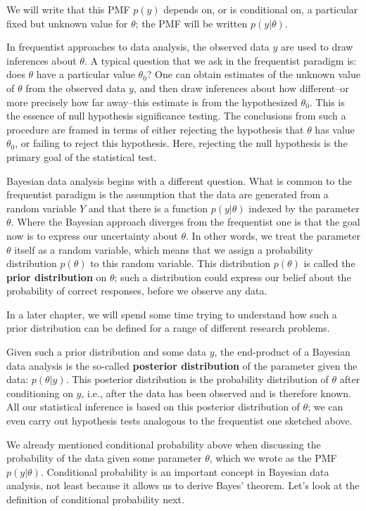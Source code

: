 \documentclass[12pt,]{krantz}
\theoremstyle{definition}
\theoremstyle{definition}
\theoremstyle{definition}
\theoremstyle{remark}
\begin{document}
We will write that this PMF \(p(y)\) depends on, or is conditional on, a particular fixed but unknown value for \(\theta\); the PMF will be written \(p(y|\theta)\).

In frequentist approaches to data analysis, the observed data \(y\) are used to draw inferences about \(\theta\). A typical question that we ask in the frequentist paradigm is: does \(\theta\) have a particular value \(\theta_0\)? One can obtain estimates of the unknown value of \(\theta\) from the observed data \(y\), and then draw inferences about how different--or more precisely how far away--this estimate is from the hypothesized \(\theta_0\). This is the essence of null hypothesis significance testing. The conclusions from such a procedure are framed in terms of either rejecting the hypothesis that \(\theta\) has value \(\theta_0\), or failing to reject this hypothesis. Here, rejecting the null hypothesis is the primary goal of the statistical test.

Bayesian data analysis begins with a different question. What is common to the frequentist paradigm is the assumption that the data are generated from a random variable \(Y\) and that there is a function \(p(y|\theta)\) indexed by the parameter \(\theta\). Where the Bayesian approach diverges from the frequentist one is that the goal now is to express our uncertainty about \(\theta\). In other words, we treat the parameter \(\theta\) itself as a random variable, which means that we assign a probability distribution \(p(\theta)\) to this random variable. This distribution \(p(\theta)\) is called the \textbf{prior distribution} on \(\theta\); such a distribution could express our belief about the probability of correct responses, before we observe any data.

In a later chapter, we will spend some time trying to understand how such a prior distribution can be defined for a range of different research problems.

Given such a prior distribution and some data \(y\), the end-product of a Bayesian data analysis is the so-called \textbf{posterior distribution} of the parameter given the data: \(p(\theta | y)\). This posterior distribution is the probability distribution of \(\theta\) after conditioning on \(y\), i.e., after the data has been observed and is therefore known. All our statistical inference is based on this posterior distribution of \(\theta\); we can even carry out hypothesis tests analogous to the frequentist one sketched above.

We already mentioned conditional probability above when discussing the probability of the data given some parameter \(\theta\), which we wrote as the PMF \(p(y|\theta)\). Conditional probability is an important concept in Bayesian data analysis, not least because it allows us to derive Bayes' theorem. Let's look at the definition of conditional probability next.
\end{document}
